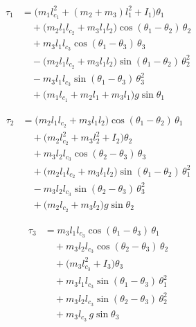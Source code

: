 \documentclass[11pt,a4paper]{article}
\newcommand{\dt}[1]{\dot{#1}}
\newcommand{\ddt}[1]{\ddot{#1}}
\def\dt#1{#1}%
\def\ddt#1{#1}%
\begin{document}
\begin{resultbox}
\begin{align}
    \tau_1 &= \bigl(m_1 l_{c_1}^2 + (m_2+m_3)l_1^2 + I_1\bigr) \ddt{\theta}_1 \nonumber \\
    &\quad + \bigl(m_2 l_1 l_{c_2} + m_3 l_1 l_2\bigr)\cos(\theta_1 - \theta_2)\,\ddt{\theta}_2 \nonumber \\
    &\quad + m_3 l_1 l_{c_3} \cos(\theta_1 - \theta_3)\,\ddt{\theta}_3 \nonumber \\
    &\quad - \bigl(m_2 l_1 l_{c_2} + m_3 l_1 l_2\bigr)\sin(\theta_1 - \theta_2)\,\dt{\theta}_2^2 \nonumber \\
    &\quad - m_3 l_1 l_{c_3} \sin(\theta_1 - \theta_3)\,\dt{\theta}_3^2 \nonumber \\
    &\quad + \bigl(m_1 l_{c_1} + m_2 l_1 + m_3 l_1\bigr) g \sin\theta_1
    \label{eq:tau1_full}
\end{align}
\end{resultbox}

\begin{resultbox}
\begin{align}
    \tau_2 &= \bigl(m_2 l_1 l_{c_2} + m_3 l_1 l_2\bigr)\cos(\theta_1 - \theta_2)\,\ddt{\theta}_1 \nonumber \\
    &\quad + \bigl(m_2 l_{c_2}^2 + m_3 l_2^2 + I_2\bigr) \ddt{\theta}_2 \nonumber \\
    &\quad + m_3 l_2 l_{c_3} \cos(\theta_2 - \theta_3)\,\ddt{\theta}_3 \nonumber \\
    &\quad + \bigl(m_2 l_1 l_{c_2} + m_3 l_1 l_2\bigr)\sin(\theta_1 - \theta_2)\,\dt{\theta}_1^2 \nonumber \\
    &\quad - m_3 l_2 l_{c_3} \sin(\theta_2 - \theta_3)\,\dt{\theta}_3^2 \nonumber \\
    &\quad + \bigl(m_2 l_{c_2} + m_3 l_2\bigr) g \sin\theta_2
    \label{eq:tau2_full}
\end{align}
\end{resultbox}

\begin{resultbox}
\begin{align}
    \tau_3 &= m_3 l_1 l_{c_3} \cos(\theta_1 - \theta_3)\,\ddt{\theta}_1 \nonumber \\
    &\quad + m_3 l_2 l_{c_3} \cos(\theta_2 - \theta_3)\,\ddt{\theta}_2 \nonumber \\
    &\quad + \bigl(m_3 l_{c_3}^2 + I_3\bigr) \ddt{\theta}_3 \nonumber \\
    &\quad + m_3 l_1 l_{c_3} \sin(\theta_1 - \theta_3)\,\dt{\theta}_1^2 \nonumber \\
    &\quad + m_3 l_2 l_{c_3} \sin(\theta_2 - \theta_3)\,\dt{\theta}_2^2 \nonumber \\
    &\quad + m_3 l_{c_3} \, g \sin\theta_3
    \label{eq:tau3_full}
\end{align}
\end{resultbox}
\end{document}

